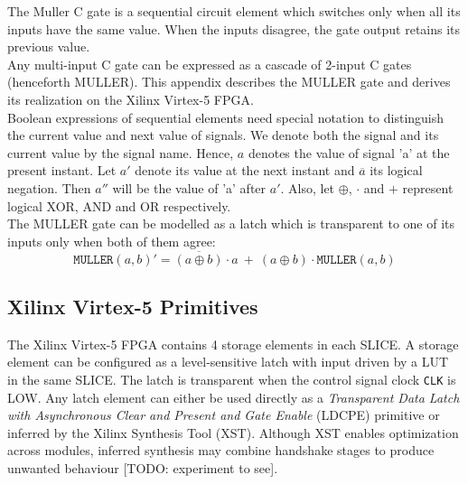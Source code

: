 The Muller C gate is a sequential circuit element which switches only when all its inputs have
the same value.
When the inputs disagree, the gate output retains its previous value.
\\
Any multi-input C gate can be expressed as a cascade of 2-input C gates
(henceforth MULLER).
This appendix describes the MULLER gate and derives its realization on 
the Xilinx Virtex-5 FPGA.
\\

Boolean expressions of sequential elements need special notation to distinguish the
current value and next value of signals. 
We denote both the signal and its current value by the signal name. 
Hence, $a$ denotes the value of signal 'a' at the present instant. 
Let $a'$ denote its value at the next instant and $\overline{a}$ its
logical negation. Then $a''$ will be the value of 'a' after $a'$.
Also, let $\oplus$, $\cdot$ and $+$ represent logical XOR, AND and OR respectively.
\\

The MULLER gate can be modelled as a latch which is transparent to one of its
inputs only when both of them agree:
\begin{equation} \label{eq:muller_c}
	\texttt{MULLER}(a,b)' = 
	\overline{(a \oplus b)} \cdot a\ +\ (a \oplus b) \cdot \texttt{MULLER}(a,b)
\end{equation}

\subsection{Xilinx Virtex-5 Primitives}

The Xilinx Virtex-5 FPGA contains 4 storage elements in each SLICE.
A storage element can be configured as a level-sensitive latch with input
driven by a LUT in the same SLICE. The latch is transparent when the control
signal clock \texttt{CLK} is LOW. Any latch element can either be used directly
as a 
\textsl{Transparent Data Latch with Asynchronous Clear and Present and Gate
Enable} (LDCPE) primitive or inferred by the Xilinx Synthesis Tool (XST).
Although XST enables optimization across modules, inferred synthesis may 
combine handshake stages to produce unwanted behaviour [TODO: experiment to
see].


